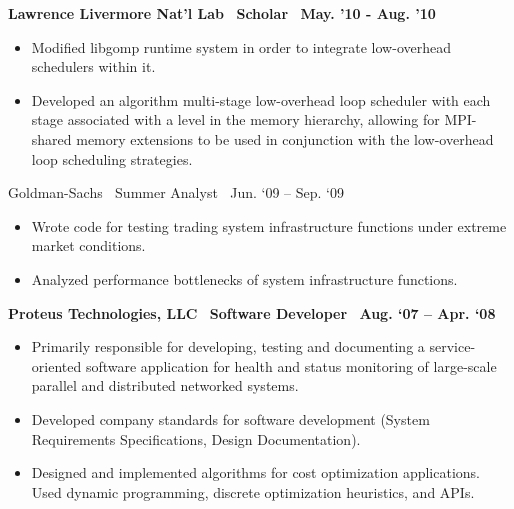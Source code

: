 \textbf{Lawrence Livermore Nat’l Lab$\>$$\>$$\>$$\>$Scholar$\>$$\>$$\>$$\>$May. '10 - Aug. '10}
\begin{itemize}
\item Modified libgomp runtime system in order to integrate low-overhead schedulers within it.
\item Developed an algorithm multi-stage low-overhead loop scheduler with each stage associated with a level in the memory hierarchy, allowing for MPI-shared memory extensions to be used in conjunction with the low-overhead loop scheduling strategies.
\end{itemize}
{Goldman-Sachs$\>\>\>\>$Summer Analyst$\>\>\>\>$Jun. ‘09 – Sep. ‘09}
\vspace*{-0.0in}
\begin{itemize}
\item Wrote code for testing trading system infrastructure functions under extreme market conditions.
\item Analyzed performance bottlenecks of system infrastructure functions.
\end{itemize}

\textbf{Proteus Technologies, LLC$\>\>\>\>$Software Developer$\>\>\>\>$Aug. ‘07 – Apr. ‘08}
\vspace*{-0.0in}
\begin{itemize} 
\item Primarily responsible for developing, testing and documenting a service-oriented software application for health and status monitoring  of large-scale parallel and distributed networked systems.
\item Developed company standards for software development (System Requirements Specifications, Design Documentation).
\item Designed and implemented algorithms for cost optimization applications. Used dynamic programming, discrete optimization heuristics, and APIs.
\end{itemize}
